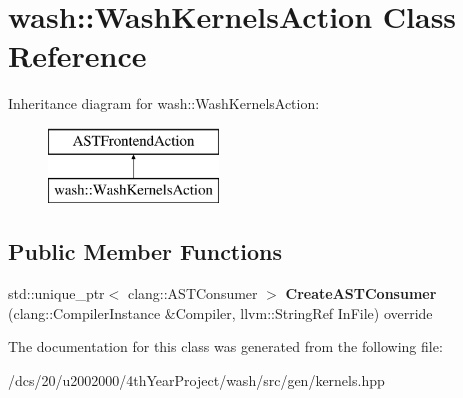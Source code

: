 \hypertarget{classwash_1_1WashKernelsAction}{}\section{wash\+:\+:Wash\+Kernels\+Action Class Reference}
\label{classwash_1_1WashKernelsAction}
Inheritance diagram for wash\+:\+:Wash\+Kernels\+Action\+:\begin{figure}[H]
\begin{center}
\leavevmode
\includegraphics[height=2.000000cm]{classwash_1_1WashKernelsAction}
\end{center}
\end{figure}
\subsection*{Public Member Functions}
\begin{DoxyCompactItemize}
\item 
\mbox{\label{classwash_1_1WashKernelsAction_a05069ff0dedbbc1bd149f12b70b8ae44}} 
std\+::unique\+\_\+ptr$<$ clang\+::\+A\+S\+T\+Consumer $>$ {\bfseries Create\+A\+S\+T\+Consumer} (clang\+::\+Compiler\+Instance \&Compiler, llvm\+::\+String\+Ref In\+File) override
\end{DoxyCompactItemize}


The documentation for this class was generated from the following file\+:\begin{DoxyCompactItemize}
\item 
/dcs/20/u2002000/4th\+Year\+Project/wash/src/gen/kernels.\+hpp\end{DoxyCompactItemize}
